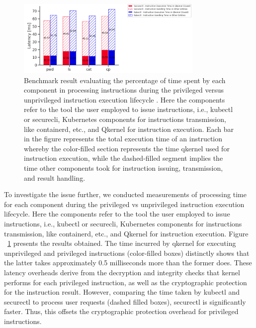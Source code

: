 \begin{figure}[H]
    \centering
    \includegraphics[width=0.8\textwidth]{images/timeshare_issuing_cmd_in_cquark_kubectl_securectl.PNG}
    \caption[Benchmark result - The processing time for components during the privileged vs unprivileged instruction execution lifecycle]{Benchmark result evaluating the percentage of time spent by each component in processing instructions during the privileged versus unprivileged instruction 
    execution lifecycle . Here the components refer to the tool the user employed to issue instructions, i.e., kubectl or securecli,  Kubernetes components for instructions transmission, like containerd, etc., and Qkernel for instruction execution.  Each bar in the 
    figure represents the total execution time of an instruction whereby the color-filled section represents the time qkernel used for instruction execution, while the dashed-filled segment implies the time other components took for instruction issuing, transmission, and result handling.
    }
    \label{fig:timeshare_issuing_cmd_in_cquark_kubectl_securectl}
\end{figure}

To investigate the issue further, we conducted  measurements of processing time for each component during the privileged vs unprivileged instruction execution lifecycle. Here the components refer to the tool the user employed 
to issue instructions, i.e., kubectl or securecli,  Kubernetes components for instructions transmission, like containerd, etc., and Qkernel for instruction execution.
Figure ~\ref{fig:timeshare_issuing_cmd_in_cquark_kubectl_securectl} presents the results obtained. The time incurred by qkernel for executing unprivileged and privileged instructions (color-filled boxes) distinctly shows that the latter takes approximately 0.5 milliseconds more than the former does. 
These latency overheads derive from the decryption and integrity checks that kernel performs for each privileged instruction, as well as the cryptographic protection for the instruction result. However, comparing the time taken by kubectl and securectl to process user requests 
(dashed filled boxes), securectl is significantly faster. Thus, this offsets the cryptographic protection overhead for privileged instructions.

